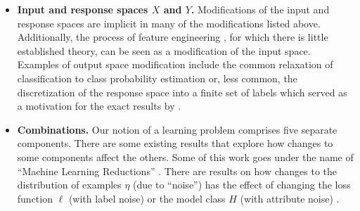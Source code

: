\documentclass[twoside,11pt]{article}
\begin{document}
\begin{itemize}
    \item \textbf{Input and response spaces $X$ and $Y$.} Modifications of the input and response spaces are implicit in many of the modifications listed above. Additionally, the process of feature engineering \citep[Ch 5]{huyen_designing}, for which there is little established theory, can be seen as a modification of the input space. Examples of output space modification include the common relaxation of classification to class probability estimation or, less common, the discretization of the response space into a finite set of labels \citep{langford_probing_2005} which served as a motivation for the exact results by \citet{Reid:2011aa}.
    \item \textbf{Combinations.} 
    Our notion of a learning problem comprises five separate components. There are 
    some existing results that explore how changes to some components affect
    the others. Some of this work goes under the name of ``Machine Learning
    Reductions'' \citep{Langford:2009aa}. There are results on how changes to 
    the distribution of examples $\eta$ (due to ``noise'') has the effect 
    of changing  the  loss function $\ell$ (with label noise) 
    \citep{rooyen_theory_2018} or the  model class $H$ 
    (with attribute noise) \citep{Bishop:1995aa,Dhifallah:2021aa,
    Rothfuss:2019aa,Smilkov:2017aa, williamson_information_2024}.

    
\end{itemize}
\end{document}
